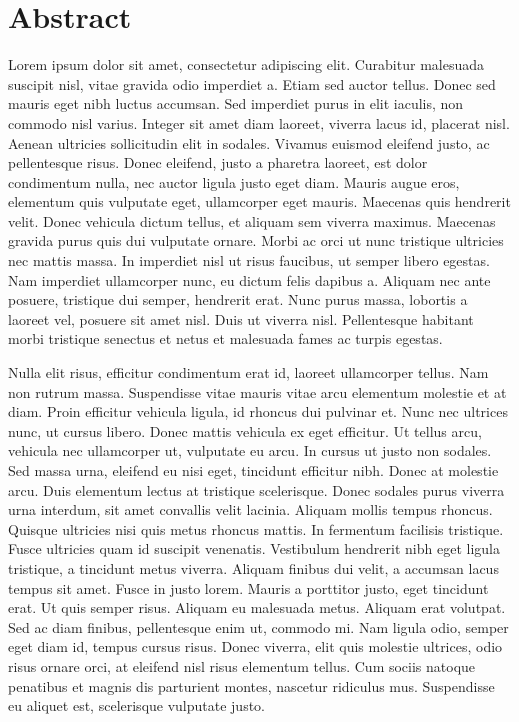 \chapter{Abstract}

Lorem ipsum dolor sit amet, consectetur adipiscing elit. Curabitur malesuada suscipit nisl, vitae gravida odio imperdiet a. Etiam sed auctor tellus. Donec sed mauris eget nibh luctus accumsan. Sed imperdiet purus in elit iaculis, non commodo nisl varius. Integer sit amet diam laoreet, viverra lacus id, placerat nisl. Aenean ultricies sollicitudin elit in sodales. Vivamus euismod eleifend justo, ac pellentesque risus. Donec eleifend, justo a pharetra laoreet, est dolor condimentum nulla, nec auctor ligula justo eget diam. Mauris augue eros, elementum quis vulputate eget, ullamcorper eget mauris.
Maecenas quis hendrerit velit. Donec vehicula dictum tellus, et aliquam sem viverra maximus. Maecenas gravida purus quis dui vulputate ornare. Morbi ac orci ut nunc tristique ultricies nec mattis massa. In imperdiet nisl ut risus faucibus, ut semper libero egestas. Nam imperdiet ullamcorper nunc, eu dictum felis dapibus a. Aliquam nec ante posuere, tristique dui semper, hendrerit erat. Nunc purus massa, lobortis a laoreet vel, posuere sit amet nisl. Duis ut viverra nisl. Pellentesque habitant morbi tristique senectus et netus et malesuada fames ac turpis egestas.

Nulla elit risus, efficitur condimentum erat id, laoreet ullamcorper tellus. Nam non rutrum massa. Suspendisse vitae mauris vitae arcu elementum molestie et at diam. Proin efficitur vehicula ligula, id rhoncus dui pulvinar et. Nunc nec ultrices nunc, ut cursus libero. Donec mattis vehicula ex eget efficitur. Ut tellus arcu, vehicula nec ullamcorper ut, vulputate eu arcu. In cursus ut justo non sodales. Sed massa urna, eleifend eu nisi eget, tincidunt efficitur nibh. Donec at molestie arcu. Duis elementum lectus at tristique scelerisque. Donec sodales purus viverra urna interdum, sit amet convallis velit lacinia. Aliquam mollis tempus rhoncus. Quisque ultricies nisi quis metus rhoncus mattis.
In fermentum facilisis tristique. Fusce ultricies quam id suscipit venenatis. Vestibulum hendrerit nibh eget ligula tristique, a tincidunt metus viverra. Aliquam finibus dui velit, a accumsan lacus tempus sit amet. Fusce in justo lorem. Mauris a porttitor justo, eget tincidunt erat. Ut quis semper risus. Aliquam eu malesuada metus. Aliquam erat volutpat. Sed ac diam finibus, pellentesque enim ut, commodo mi. Nam ligula odio, semper eget diam id, tempus cursus risus. Donec viverra, elit quis molestie ultrices, odio risus ornare orci, at eleifend nisl risus elementum tellus. Cum sociis natoque penatibus et magnis dis parturient montes, nascetur ridiculus mus. Suspendisse eu aliquet est, scelerisque vulputate justo.

